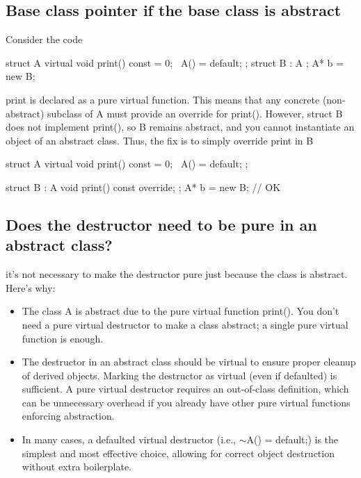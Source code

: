 \documentclass{report}
\begin{document}
     \bigbreak \noindent 
     \subsection{Base class pointer if the base class is abstract}
     \bigbreak \noindent 
     Consider the code
     \bigbreak \noindent 
     \begin{cppcode}
     struct A {
         virtual void print() const = 0;
         ~A() = default;
     };
     struct B : A { };
     A* b = new B{};
     \end{cppcode}
     \bigbreak \noindent 
     print is declared as a pure virtual function. This means that any concrete (non-abstract) subclass of A must provide an override for print(). However, struct B does not implement print(), so B remains abstract, and you cannot instantiate an object of an abstract class.
     \bigbreak \noindent 
     Thus, the fix is to simply override print in B
     \bigbreak \noindent 
     \begin{cppcode}
         struct A {
             virtual void print() const = 0;
             ~A() = default;
         };

         struct B : A {
             void print() const override;
         };
         A* b = new B{}; // OK
     \end{cppcode}

     \bigbreak \noindent 
     \subsection{Does the destructor need to be pure in an abstract class?}
     \bigbreak \noindent 
     it's not necessary to make the destructor pure just because the class is abstract. Here's why:
     \begin{itemize}
         \item The class A is abstract due to the pure virtual function print(). You don't need a pure virtual destructor to make a class abstract; a single pure virtual function is enough.
            \item The destructor in an abstract class should be virtual to ensure proper cleanup of derived objects. Marking the destructor as virtual (even if defaulted) is sufficient. A pure virtual destructor requires an out-of-class definition, which can be unnecessary overhead if you already have other pure virtual functions enforcing abstraction.
            \item In many cases, a defaulted virtual destructor (i.e., $\sim$A() = default;) is the simplest and most effective choice, allowing for correct object destruction without extra boilerplate.
     \end{itemize}
\end{document}
